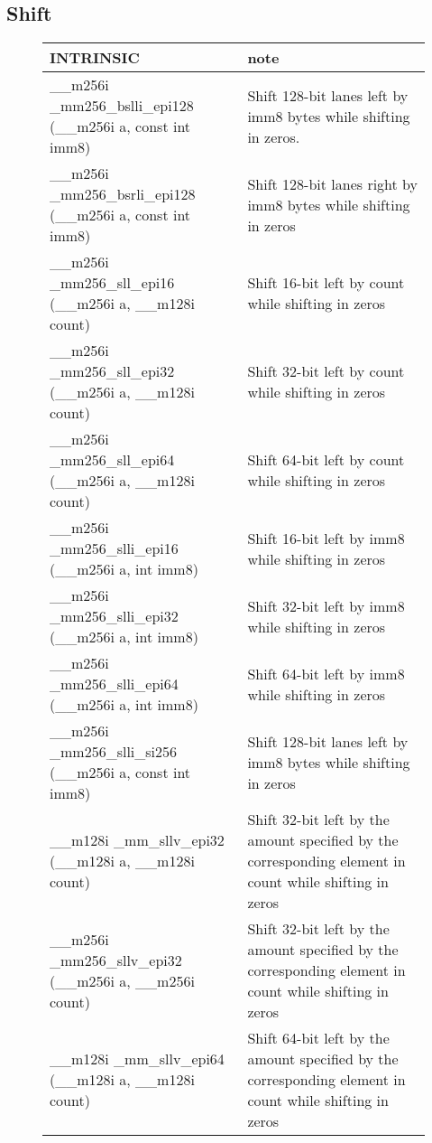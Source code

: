 \documentclass{article}
\begin{document}
\subsection{Shift}
\vspace{1cm}
\begin{figure}[h!]
\noindent
\noindent\begin{tabular}{|l|l|}
  \hline
  INTRINSIC & note \\
  \hline
\_\_m256i \_mm256\_bslli\_epi128 (\_\_m256i a, const int imm8) & Shift 128-bit lanes  left by imm8 bytes while shifting in zeros.\\
\_\_m256i \_mm256\_bsrli\_epi128 (\_\_m256i a, const int imm8) & Shift 128-bit lanes right by imm8 bytes while shifting in zeros \\
  \hline
  \_\_m256i \_mm256\_sll\_epi16 (\_\_m256i a, \_\_m128i count) & Shift 16-bit left by count while shifting in zeros\\
  \hline
    \_\_m256i \_mm256\_sll\_epi32 (\_\_m256i a, \_\_m128i count) & Shift 32-bit left by count while shifting in zeros\\
  \hline
    \_\_m256i \_mm256\_sll\_epi64 (\_\_m256i a, \_\_m128i count) & Shift 64-bit left by count while shifting in zeros\\
  \hline
    \_\_m256i \_mm256\_slli\_epi16 (\_\_m256i a, int imm8) & Shift 16-bit left by imm8 while shifting in zeros\\
  \hline
    \_\_m256i \_mm256\_slli\_epi32 (\_\_m256i a, int imm8) & Shift 32-bit left by imm8 while shifting in zeros\\
  \hline
    \_\_m256i \_mm256\_slli\_epi64 (\_\_m256i a, int imm8) & Shift 64-bit left by imm8 while shifting in zeros\\
  \hline
  \_\_m256i \_mm256\_slli\_si256 (\_\_m256i a, const int imm8) & 
Shift 128-bit lanes left by imm8 bytes while shifting in zeros\\
  \hline
 \_\_m128i \_mm\_sllv\_epi32 (\_\_m128i a, \_\_m128i count) & Shift 32-bit left by the amount specified by the corresponding element in count while shifting in zeros\\
  \hline
   \_\_m256i \_mm256\_sllv\_epi32 (\_\_m256i a, \_\_m256i count) & Shift 32-bit left by the amount specified by the corresponding element in count while shifting in zeros\\
  \hline
   \_\_m128i \_mm\_sllv\_epi64 (\_\_m128i a, \_\_m128i count) & Shift 64-bit left by the amount specified by the corresponding element in count while shifting in zeros\\

\end{tabular}
\end{figure}
\end{document}

